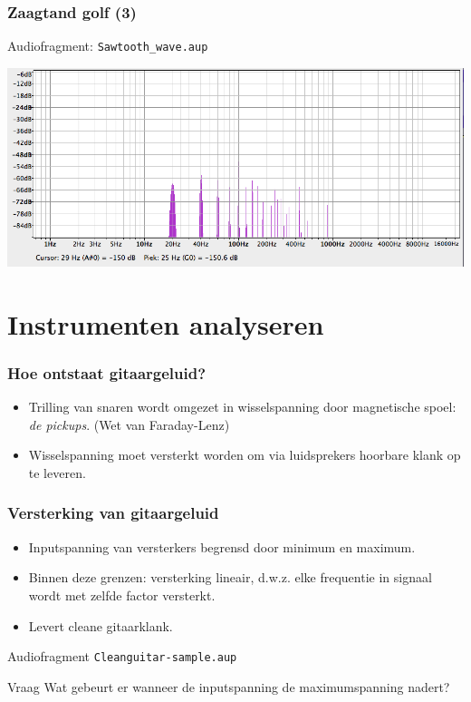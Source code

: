 \documentclass[compress, darktitle, framenumber, totalframenumber]{beamer}
\begin{document}
\begin{frame}
\frametitle{Zaagtand golf (3)}
\begin{block}{Audiofragment:}
\texttt{Sawtooth\_wave.aup}
\end{block}
\pause
\includegraphics[width=\textwidth]{images/Sawtooth_wave.png}
\end{frame}

\section{Instrumenten analyseren}

\begin{frame}
\frametitle{Hoe ontstaat gitaargeluid?}
\begin{itemize}
\item Trilling van snaren wordt omgezet in wisselspanning door magnetische spoel: \textit{de pickups}. (Wet van Faraday-Lenz)
\item Wisselspanning moet versterkt worden om via luidsprekers hoorbare klank op te leveren. 
\end{itemize}
\end{frame}

\begin{frame}
\frametitle{Versterking van gitaargeluid}
\begin{itemize}
\item Inputspanning van versterkers begrensd door minimum en maximum.
\item Binnen deze grenzen: versterking lineair, d.w.z. elke frequentie in signaal wordt met zelfde factor versterkt.
\item Levert cleane gitaarklank. 
\end{itemize}
\begin{block}{Audiofragment}
\texttt{Cleanguitar-sample.aup}
\end{block}
\begin{block}{Vraag}
Wat gebeurt er wanneer de inputspanning de maximumspanning nadert?
\end{block}
\end{frame}
\end{document}

